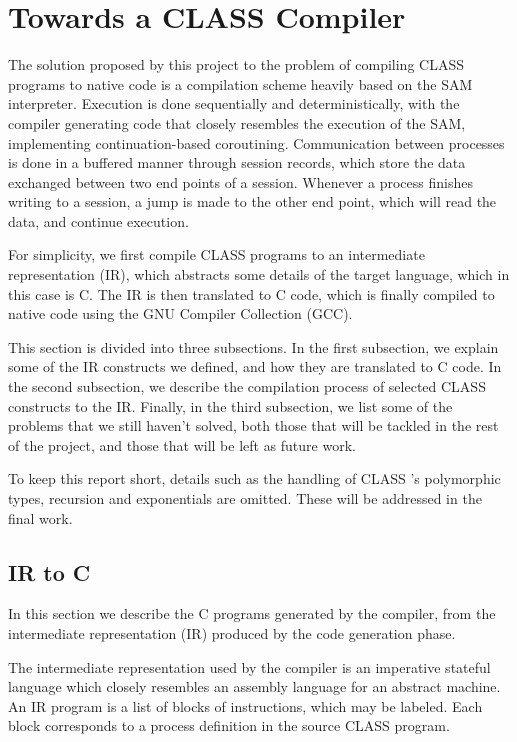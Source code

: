 
\section{Towards a CLASS Compiler}

The solution proposed by this project to the problem of compiling CLASS programs to native code is a compilation scheme heavily based on the SAM interpreter. Execution is done sequentially and deterministically, with the compiler generating code that closely resembles the execution of the SAM, implementing continuation-based coroutining. Communication between processes is done in a buffered manner through session records, which store the data exchanged between two end points of a session. Whenever a process finishes writing to a session, a jump is made to the other end point, which will read the data, and continue execution.

For simplicity, we first compile CLASS programs to an intermediate representation (IR), which abstracts some details of the target language, which in this case is C. The IR is then translated to C code, which is finally compiled to native code using the GNU Compiler Collection (GCC).

This section is divided into three subsections. In the first subsection, we explain some of the IR constructs we defined, and how they are translated to C code. In the second subsection, we describe the compilation process of selected CLASS constructs to the IR. Finally, in the third subsection, we list some of the problems that we still haven't solved, both those that will be tackled in the rest of the project, and those that will be left as future work.

To keep this report short, details such as the handling of CLASS 's polymorphic types, recursion and exponentials are omitted. These will be addressed in the final work.

\subsection{IR to C}

In this section we describe the C programs generated by the compiler, from the intermediate representation (IR) produced by the code generation phase.

The intermediate representation used by the compiler is an imperative stateful language which closely resembles an assembly language for an abstract machine. An IR program is a list of blocks of instructions, which may be labeled. Each block corresponds to a process definition in the source CLASS program.

